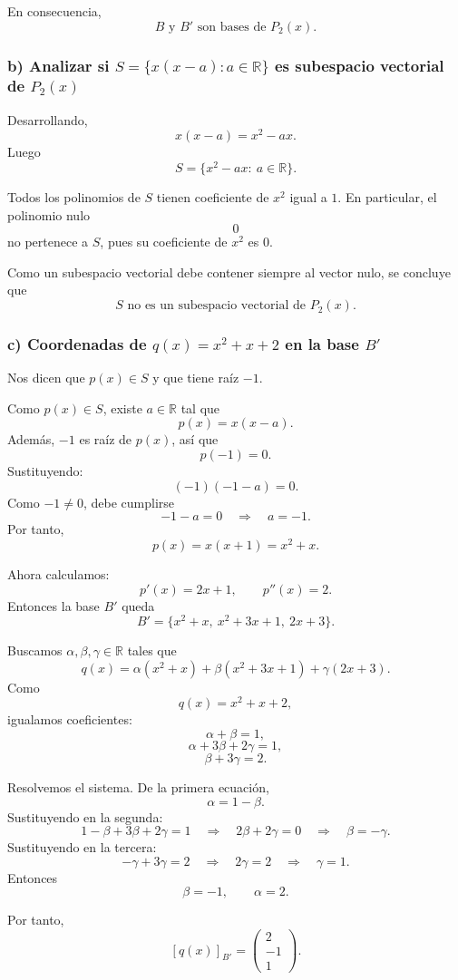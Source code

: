 \documentclass[12pt]{article}
\begin{document}
En consecuencia,
\[
\boxed{B \text{ y } B' \text{ son bases de } P_2(x).}
\]

\subsubsection*{b) Analizar si \(S=\{x(x-a):a\in\mathbb{R}\}\) es subespacio vectorial de \(P_2(x)\)}

Desarrollando,
\[
x(x-a)=x^2-ax.
\]
Luego
\[
S=\{x^2-ax:\ a\in\mathbb{R}\}.
\]

Todos los polinomios de \(S\) tienen coeficiente de \(x^2\) igual a \(1\). En particular, el polinomio nulo
\[
0
\]
no pertenece a \(S\), pues su coeficiente de \(x^2\) es \(0\).

Como un subespacio vectorial debe contener siempre al vector nulo, se concluye que
\[
\boxed{S \text{ no es un subespacio vectorial de } P_2(x).}
\]

\subsubsection*{c) Coordenadas de \(q(x)=x^2+x+2\) en la base \(B'\)}

Nos dicen que \(p(x)\in S\) y que tiene raíz \(-1\).

Como \(p(x)\in S\), existe \(a\in\mathbb{R}\) tal que
\[
p(x)=x(x-a).
\]
Además, \(-1\) es raíz de \(p(x)\), así que
\[
p(-1)=0.
\]
Sustituyendo:
\[
(-1)(-1-a)=0.
\]
Como \(-1\neq 0\), debe cumplirse
\[
-1-a=0
\quad\Longrightarrow\quad
a=-1.
\]
Por tanto,
\[
p(x)=x(x+1)=x^2+x.
\]

Ahora calculamos:
\[
p'(x)=2x+1,
\qquad
p''(x)=2.
\]
Entonces la base \(B'\) queda
\[
B'=\{x^2+x,\ x^2+3x+1,\ 2x+3\}.
\]

Buscamos \(\alpha,\beta,\gamma\in\mathbb{R}\) tales que
\[
q(x)=\alpha(x^2+x)+\beta(x^2+3x+1)+\gamma(2x+3).
\]
Como
\[
q(x)=x^2+x+2,
\]
igualamos coeficientes:
\[
\alpha+\beta=1,
\]
\[
\alpha+3\beta+2\gamma=1,
\]
\[
\beta+3\gamma=2.
\]

Resolvemos el sistema. De la primera ecuación,
\[
\alpha=1-\beta.
\]
Sustituyendo en la segunda:
\[
1-\beta+3\beta+2\gamma=1
\quad\Longrightarrow\quad
2\beta+2\gamma=0
\quad\Longrightarrow\quad
\beta=-\gamma.
\]
Sustituyendo en la tercera:
\[
-\gamma+3\gamma=2
\quad\Longrightarrow\quad
2\gamma=2
\quad\Longrightarrow\quad
\gamma=1.
\]
Entonces
\[
\beta=-1,
\qquad
\alpha=2.
\]

Por tanto,
\[
[q(x)]_{B'}=
\begin{pmatrix}
2\\
-1\\
1
\end{pmatrix}.
\]
\end{document}
